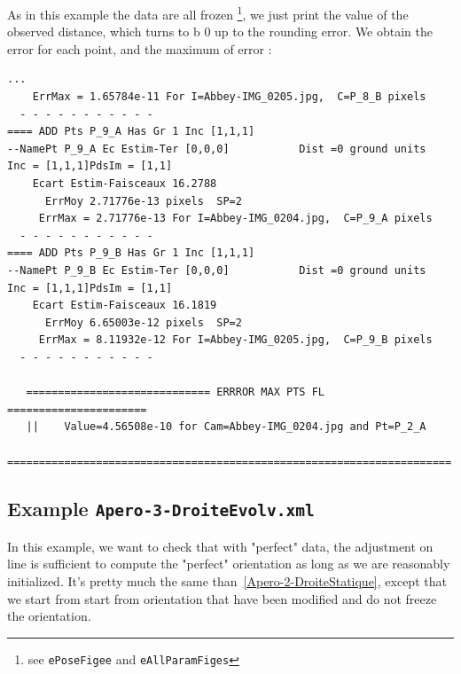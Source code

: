 As in this example the data are all frozen \footnote{see {\tt ePoseFigee} and {\tt eAllParamFiges}}, we just print the
value of the observed distance, which turns to b $0$ up to the rounding error. We obtain the error for each point, and 
the maximum of error :


\begin{verbatim}
...
    ErrMax = 1.65784e-11 For I=Abbey-IMG_0205.jpg,  C=P_8_B pixels 
  - - - - - - - - - - - 
==== ADD Pts P_9_A Has Gr 1 Inc [1,1,1]
--NamePt P_9_A Ec Estim-Ter [0,0,0]           Dist =0 ground units
Inc = [1,1,1]PdsIm = [1,1]
    Ecart Estim-Faisceaux 16.2788
      ErrMoy 2.71776e-13 pixels  SP=2 
     ErrMax = 2.71776e-13 For I=Abbey-IMG_0204.jpg,  C=P_9_A pixels 
  - - - - - - - - - - - 
==== ADD Pts P_9_B Has Gr 1 Inc [1,1,1]
--NamePt P_9_B Ec Estim-Ter [0,0,0]           Dist =0 ground units
Inc = [1,1,1]PdsIm = [1,1]
    Ecart Estim-Faisceaux 16.1819
      ErrMoy 6.65003e-12 pixels  SP=2 
     ErrMax = 8.11932e-12 For I=Abbey-IMG_0205.jpg,  C=P_9_B pixels 
  - - - - - - - - - - - 

   ============================= ERRROR MAX PTS FL ======================
   ||    Value=4.56508e-10 for Cam=Abbey-IMG_0204.jpg and Pt=P_2_A
   ======================================================================
\end{verbatim}


\subsection{Example {\tt Apero-3-DroiteEvolv.xml}}

In this example, we  want to check that with "perfect" data, the adjustment on line
is sufficient to compute the "perfect" orientation as long as we are reasonably initialized.
It's pretty much the same than~\ref{Apero-2-DroiteStatique},
except that we start from start from orientation that have been modified and
do not freeze the orientation.



